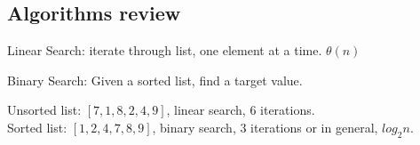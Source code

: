 \documentclass{article}
\begin{document}
\subsection{Algorithms review}
    \begin{definition}
        Linear Search: iterate through list, one element at a time. $\theta (n)$
    \end{definition}
    \begin{definition}
        Binary Search: Given a sorted list, find a target value.
    \end{definition}
    Unsorted list: $[7,1,8,2,4,9]$, linear search, 6 iterations. \\
    Sorted list: $[1,2,4,7,8,9]$, binary search, 3 iterations or in general, $log_2n$.
    


\end{document}
